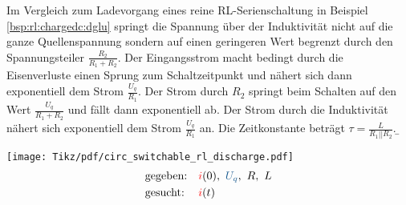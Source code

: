 \begin{frame}[t]
{    Im Vergleich zum Ladevorgang eines reine RL-Serienschaltung in Beispiel \ref{bsp:rl:chargedc:dglu} springt die Spannung
    über der Induktivität nicht auf die ganze Quellenspannung sondern auf einen geringeren Wert begrenzt durch den Spannungsteiler $\frac{R_2}{R_1+R_2}$.
    Der Eingangsstrom macht bedingt durch die Eisenverluste einen Sprung zum Schaltzeitpunkt und nähert sich dann exponentiell dem Strom $\frac{U_q}{R_1}$.
    Der Strom durch $R_2$ springt beim Schalten auf den Wert $\frac{U_q}{R_1+R_2}$ und fällt dann exponentiell ab.
    Der Strom durch die Induktivität nähert sich exponentiell dem Strom $\frac{U_q}{R_1}$ an. Die Zeitkonstante beträgt $\tau=\frac{L}{R_1||R_2}$.
}%
\b{%
\begin{minipage}{\textwidth}\centering
\begin{minipage}[t][][t]{0.48\textwidth}\centering\vspace{0cm}%
    \texttt{[image: Tikz/pdf/circ\_switchable\_rl\_discharge.pdf]}%
    \begin{equation*}\begin{aligned}
        &\text{gegeben:}&       &\eci{i}(0),\ \ecv{U_q},\ R,\ L \\
        &\text{gesucht:}&       &\eci{i}(t)
    \end{aligned}\end{equation*}
\end{minipage}
\begin{minipage}[t][][t]{0.48\textwidth}\centering\vspace{0cm}%
\end{minipage}
\end{minipage}
%
}%


\end{frame}
